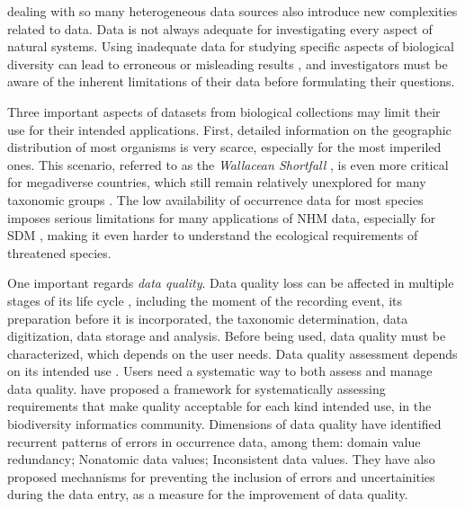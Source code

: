 dealing with so many heterogeneous data sources also introduce new complexities related to data.
Data is not always adequate for investigating every aspect of natural systems.
Using inadequate data for studying specific aspects of biological diversity can lead to erroneous or misleading results \cite{Chapman2005}, and investigators must be aware of the inherent limitations of their data before formulating their questions. %

Three important aspects of datasets from biological collections may limit their use for their intended applications.
First, detailed information on the geographic distribution of most organisms is very scarce, especially for the most imperiled ones. 
This scenario, referred to as the \textit{Wallacean Shortfall} \cite{Lomolino2004}, is even more critical for megadiverse countries, which still remain relatively unexplored for many taxonomic groups \cite{Soberon2004}.
The low availability of occurrence data for most species imposes serious limitations for many applications of NHM data, especially for SDM \cite{Galante2017}, making it even harder to understand the ecological requirements of threatened species.






One important regards \textit{data quality}.
%
%
Data quality loss can be affected in multiple stages of its life cycle \cite{Chapman2005}, including the moment of the recording event, its preparation before it is incorporated, the taxonomic determination, data digitization, data storage and analysis.
%
Before being used, data quality must be characterized, which depends on the user needs.
Data quality assessment depends on its intended use \cite{}.
%
Users need a systematic way to both assess and manage data quality.
 have proposed a framework for systematically assessing requirements that make quality acceptable for each kind intended use, in the biodiversity informatics community.
%
Dimensions of data quality \cite{Veiga2014}
 have identified recurrent patterns of errors in occurrence data, among them:
domain value redundancy;
Nonatomic data values;
Inconsistent data values.
They have also proposed mechanisms for preventing the inclusion of errors and uncertainities during the data entry, as a measure for the improvement of data quality.


